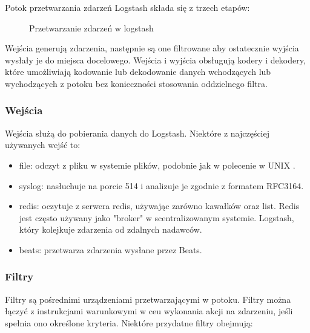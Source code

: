 Potok przetwarzania zdarzeń Logstash składa się z trzech etapów:

\begin{figure}[!htbp]
    \centering
    
    \caption{Przetwarzanie zdarzeń w logstash}
    \label{fig:enter-label}
\end{figure}

Wejścia generują zdarzenia, następnie są one filtrowane aby ostatecznie wyjścia wysłały je do miejsca docelowego. Wejścia i wyjścia obsługują kodery i dekodery, które umożliwiają kodowanie lub dekodowanie danych wchodzących lub wychodzących z potoku bez konieczności stosowania oddzielnego filtra\cite{logstashManualHowItWorks}. 

\subsubsection{Wejścia}

Wejścia służą do pobierania danych do Logstash. Niektóre z najczęściej używanych wejść to:

\begin{itemize}
    \item file: odczyt z pliku w systemie plików, podobnie jak w polecenie w UNIX \cite{logstashManualHowItWorks}.
    \item syslog: nasłuchuje na porcie 514 i analizuje je zgodnie z formatem RFC3164\cite{rfc3164}\cite{logstashManualHowItWorks}.
    \item redis: oczytuje z serwera redis, używając zarówno kawałków oraz list. Redis jest często używany jako "broker" w scentralizowanym systemie. Logstash, który kolejkuje zdarzenia od zdalnych nadawców\cite{logstashManualHowItWorks}.
    \item beats: przetwarza zdarzenia wysłane przez Beats\cite{logstashManualHowItWorks}.
\end{itemize}

\subsubsection{Filtry}

Filtry są pośrednimi urządzeniami przetwarzającymi w potoku. Filtry można łączyć z instrukcjami warunkowymi w ceu wykonania akcji na zdarzeniu, jeśli spełnia ono określone kryteria. Niektóre przydatne filtry obejmują: 

